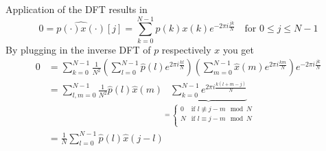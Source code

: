 \documentclass[10pt,a4paper]{article}
\theoremstyle{thmstyle}
\begin{document}
Application of the DFT results in
\begin{equation*}
  0 = \widehat{p(\cdot)x(\cdot)}[j] = \sum_{k = 0}^{N - 1} p(k)x(k) e^{-2\pi i \frac{jk}{N}} \quad \text{for $0 \le j \le N - 1$}
\end{equation*}
By plugging in the inverse DFT of $p$ respectively $x$ you get
\begin{align}
  0 & = \sum_{k = 0}^{N - 1} \frac{1}{N^{2}} \left( \sum_{l = 0}^{N - 1} \hat{p}(l) e^{2\pi i \frac{kl}{N}} \right) \left( \sum_{m = 0}^{N - 1} \hat{x}(m) e^{2\pi i \frac{km}{N}} \right) e^{-2\pi i \frac{jk}{N}}\nonumber\\
    & = \sum_{l, m = 0}^{N - 1} \frac{1}{N^{2}} \hat{p}(l) \hat{x}(m) \underbrace{\sum_{k = 0}^{N - 1} e^{2\pi i \frac{k(l + m - j)}{N}}}_{= \begin{cases}
        0 & \text{if $l \not\equiv j - m \mod N$}\\
        N & \text{if $l \equiv j - m \mod N$}\\
      \end{cases}}\nonumber\\
    & = \frac{1}{N} \sum_{l = 0}^{N - 1} \hat{p}(l) \hat{x}(j - l) \label{eq:prony-sum}
\end{align}
\end{document}
